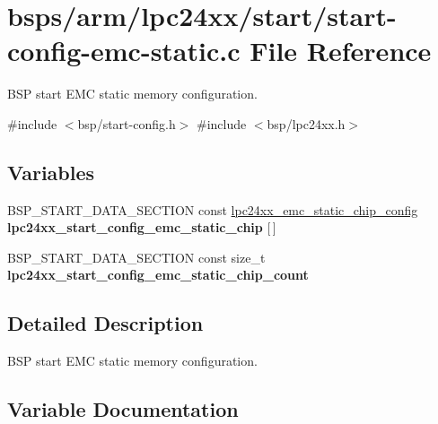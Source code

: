 \hypertarget{start-config-emc-static_8c}{}\section{bsps/arm/lpc24xx/start/start-\/config-\/emc-\/static.c File Reference}
\label{start-config-emc-static_8c}


B\+SP start E\+MC static memory configuration.  


{\ttfamily \#include $<$bsp/start-\/config.\+h$>$}\newline
{\ttfamily \#include $<$bsp/lpc24xx.\+h$>$}\newline
\subsection*{Variables}
\begin{DoxyCompactItemize}
\item 
\mbox{\label{start-config-emc-static_8c_ab4cfd56aefc76a77e47abe841a9b661f}} 
B\+S\+P\+\_\+\+S\+T\+A\+R\+T\+\_\+\+D\+A\+T\+A\+\_\+\+S\+E\+C\+T\+I\+ON const \mbox{\hyperlink{structlpc24xx__emc__static__chip__config}{lpc24xx\+\_\+emc\+\_\+static\+\_\+chip\+\_\+config}} {\bfseries lpc24xx\+\_\+start\+\_\+config\+\_\+emc\+\_\+static\+\_\+chip} \mbox{[}$\,$\mbox{]}
\item 
B\+S\+P\+\_\+\+S\+T\+A\+R\+T\+\_\+\+D\+A\+T\+A\+\_\+\+S\+E\+C\+T\+I\+ON const size\+\_\+t {\bfseries lpc24xx\+\_\+start\+\_\+config\+\_\+emc\+\_\+static\+\_\+chip\+\_\+count}
\end{DoxyCompactItemize}


\subsection{Detailed Description}
B\+SP start E\+MC static memory configuration. 



\subsection{Variable Documentation}
\mbox{\label{start-config-emc-static_8c_ae5edd159c1f32543b939bef7cf07c8ee}} 
